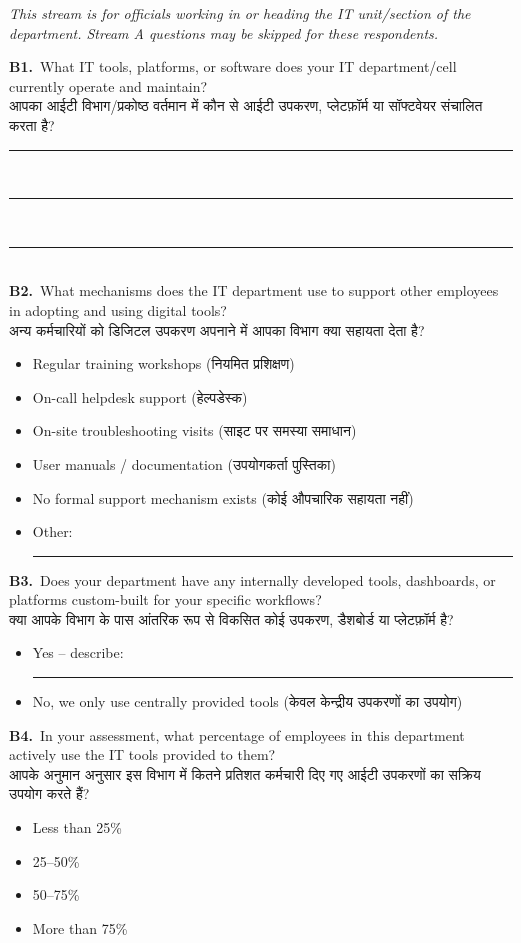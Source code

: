 \documentclass[11pt,a4paper]{article}
\newcommand{\hindi}[1]{{\hindifont #1}}
\newcommand{\q}[2]{%
  \vspace{4pt}
  \noindent\textbf{#1.}~#2\\[2pt]
}
\newcommand{\ans}{%
  \noindent\rule{\textwidth}{0.3pt}\\[3pt]
}
\newcommand{\choices}[1]{%
  \begin{itemize}[label=$\square$, leftmargin=1.4em, itemsep=1pt, topsep=2pt]
    #1
  \end{itemize}
}
\begin{document}
\begin{tcolorbox}[colback=streamb,colframe=govblue!60,arc=2mm,boxrule=0.6pt,
  title={\textbf{STREAM B -- For IT Department / IT Cell Officials} \quad \small\hindi{(आईटी विभाग / प्रकोष्ठ के अधिकारी)}},fonttitle=\normalsize]

\textit{\small This stream is for officials working in or heading the IT unit/section of the department. Stream A questions may be skipped for these respondents.}
\vspace{6pt}

\q{B1}{What IT tools, platforms, or software does your IT department/cell currently operate and maintain?\\
\hindi{आपका आईटी विभाग/प्रकोष्ठ वर्तमान में कौन से आईटी उपकरण, प्लेटफ़ॉर्म या सॉफ्टवेयर संचालित करता है?}}
\ans\ans\ans

\q{B2}{What mechanisms does the IT department use to support other employees in adopting and using digital tools?\\
\hindi{अन्य कर्मचारियों को डिजिटल उपकरण अपनाने में आपका विभाग क्या सहायता देता है?}}
\choices{
  \item Regular training workshops \hindi{(नियमित प्रशिक्षण)}
  \item On-call helpdesk support \hindi{(हेल्पडेस्क)}
  \item On-site troubleshooting visits \hindi{(साइट पर समस्या समाधान)}
  \item User manuals / documentation \hindi{(उपयोगकर्ता पुस्तिका)}
  \item No formal support mechanism exists \hindi{(कोई औपचारिक सहायता नहीं)}
  \item Other: \rule{5cm}{0.3pt}
}

\q{B3}{Does your department have any internally developed tools, dashboards, or platforms custom-built for your specific workflows?\\
\hindi{क्या आपके विभाग के पास आंतरिक रूप से विकसित कोई उपकरण, डैशबोर्ड या प्लेटफ़ॉर्म है?}}
\choices{
  \item Yes -- describe: \rule{8cm}{0.3pt}
  \item No, we only use centrally provided tools \hindi{(केवल केन्द्रीय उपकरणों का उपयोग)}
}

\q{B4}{In your assessment, what percentage of employees in this department actively use the IT tools provided to them?\\
\hindi{आपके अनुमान अनुसार इस विभाग में कितने प्रतिशत कर्मचारी दिए गए आईटी उपकरणों का सक्रिय उपयोग करते हैं?}}
\choices{
  \item Less than 25\% \quad
  \item 25--50\% \quad
  \item 50--75\% \quad
  \item More than 75\%
}


\end{tcolorbox}
\end{document}
